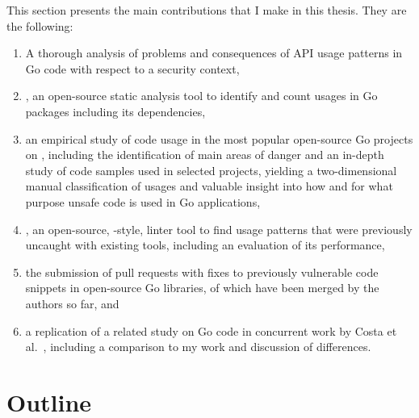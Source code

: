 This section presents the main contributions that I make in this thesis. They are the following:

\begin{enumerate}
    \item A thorough analysis of problems and consequences of \unsafe{} API usage patterns in Go code with respect to a
    security context,

    \item \toolGeiger, an open-source static analysis tool to identify and count \unsafe{} usages in Go packages
    including its dependencies,

    \item an empirical study of \unsafe{} code usage in the \projsTotal{} most popular open-source Go projects on
    \github{}, including the identification of  main areas of danger and an in-depth study of
    \numberLabeledCodeSnippets{} code samples used in \projsForLabeledCodeSnippets{} selected projects, yielding a
    two-dimensional manual classification of usages and valuable insight into how and for what purpose unsafe code is
    used in Go applications,

    \item \toolSafer{}, an open-source, \toolVet{}-style, linter tool to find  \unsafe{} usage patterns
    that were previously uncaught with existing tools, including an evaluation of its performance,

    \item the submission of \numberPRs{} pull requests with fixes to \numberBugsFixed{} previously vulnerable code
    snippets in open-source Go libraries, \numberPRsMerged{} of which have been merged by the authors so far, and

    \item a replication of a related study on \unsafe{} Go code in concurrent work by Costa et al.~\cite{costa2020},
    including a comparison to my work and discussion of differences.
\end{enumerate}



\section{Outline}\label{sec:outline}

